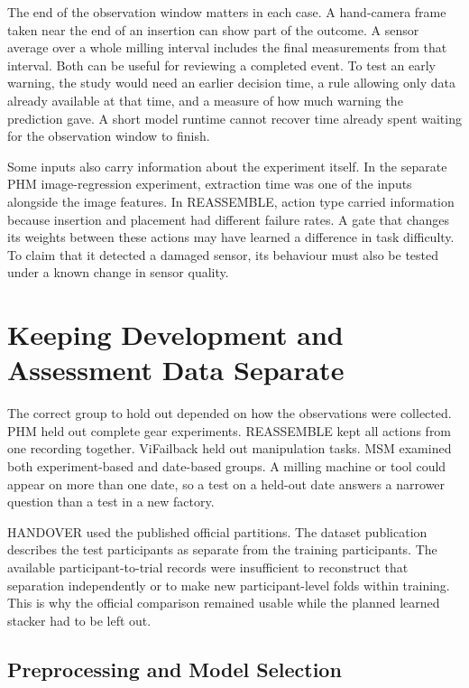 The end of the observation window matters in each case. A hand-camera frame taken near
the end of an insertion can show part of the outcome. A sensor average over a whole
milling interval includes the final measurements from that interval. Both can be useful
for reviewing a completed event. To test an early warning, the study would need an
earlier decision time, a rule allowing only data already available at that time, and a
measure of how much warning the prediction gave. A short model runtime cannot recover
time already spent waiting for the observation window to finish.

Some inputs also carry information about the experiment itself. In the separate PHM
image-regression experiment, extraction time was one of the inputs alongside the image
features. In REASSEMBLE, action type carried information because insertion and placement
had different failure rates. A gate that changes its weights between these actions may
have learned a difference in task difficulty. To claim that it detected a damaged
sensor, its behaviour must also be tested under a known change in sensor quality.

\section{Keeping Development and Assessment Data Separate}
\label{sec:ch4-assessment}

The correct group to hold out depended on how the observations were collected. PHM held
out complete gear experiments. REASSEMBLE kept all actions from one recording together.
ViFailback held out manipulation tasks. MSM examined both experiment-based and
date-based groups. A milling machine or tool could appear on more than one date, so a
test on a held-out date answers a narrower question than a test in a new factory.

HANDOVER used the published official partitions. The dataset publication describes the
test participants as separate from the training participants. The available
participant-to-trial records were insufficient to reconstruct that separation
independently or to make new participant-level folds within training. This is why the
official comparison remained usable while the planned learned stacker had to be left
out.

\subsection{Preprocessing and Model Selection}


